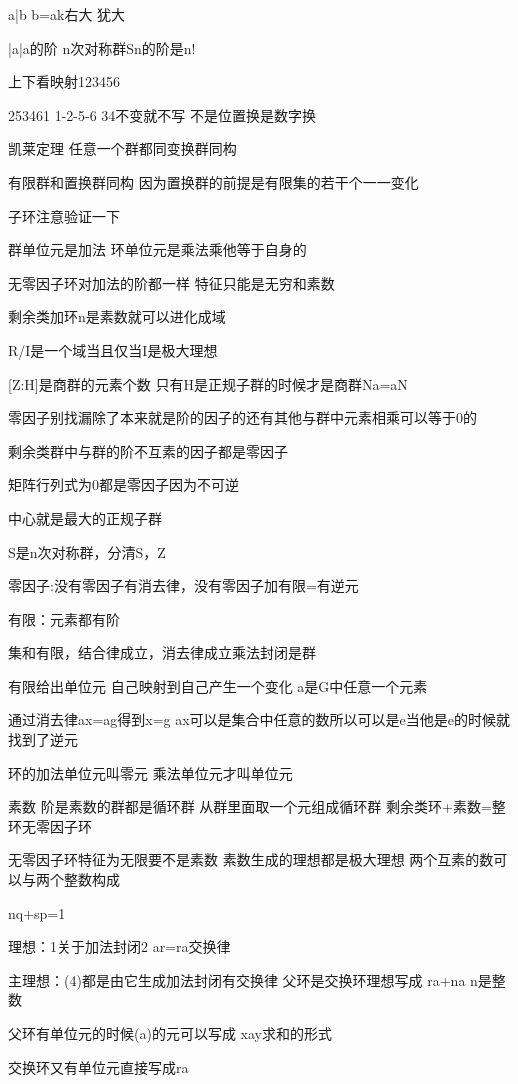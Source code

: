 \begin{note}[考前必看]

a|b b=ak右大 犹大

|a|a的阶 n次对称群Sn的阶是n!

上下看映射123456

253461 1-2-5-6 34不变就不写 不是位置换是数字换

凯莱定理 任意一个群都同变换群同构

有限群和置换群同构 因为置换群的前提是有限集的若干个一一变化

子环注意验证一下

群单位元是加法 环单位元是乘法乘他等于自身的

无零因子环对加法的阶都一样 特征只能是无穷和素数

剩余类加环n是素数就可以进化成域

R/I是一个域当且仅当I是极大理想

[Z:H]是商群的元素个数 只有H是正规子群的时候才是商群Na=aN

零因子别找漏除了本来就是阶的因子的还有其他与群中元素相乘可以等于0的

剩余类群中与群的阶不互素的因子都是零因子

矩阵行列式为0都是零因子因为不可逆

中心就是最大的正规子群

S是n次对称群，分清S，Z

零因子:没有零因子有消去律，没有零因子加有限=有逆元

有限：元素都有阶

集和有限，结合律成立，消去律成立乘法封闭是群

有限给出单位元 自己映射到自己产生一个变化 a是G中任意一个元素

通过消去律ax=ag得到x=g ax可以是集合中任意的数所以可以是e当他是e的时候就找到了逆元

环的加法单位元叫零元 乘法单位元才叫单位元

素数 阶是素数的群都是循环群 从群里面取一个元组成循环群 剩余类环+素数=整环无零因子环

无零因子环特征为无限要不是素数 素数生成的理想都是极大理想 两个互素的数可以与两个整数构成

nq+sp=1

理想：1关于加法封闭2 ar=ra交换律

主理想：(4)都是由它生成加法封闭有交换律 父环是交换环理想写成 ra+na n是整数

父环有单位元的时候(a)的元可以写成 xay求和的形式

交换环又有单位元直接写成ra


\end{note}
